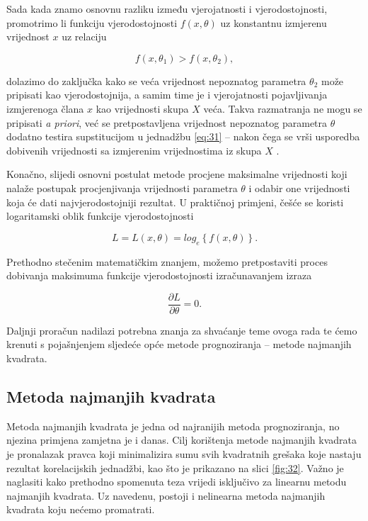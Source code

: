 \documentclass[a4paper,12pt,oneside]{memoir}
\begin{document}
                
                Sada kada znamo osnovnu razliku između vjerojatnosti i vjerodostojnosti, promotrimo li funkciju vjerodostojnosti $f(x,\theta)$ uz konstantnu izmjerenu vrijednost $x$ uz relaciju

                \begin{equation}
                    f(x,\theta_1)>f(x,\theta_2),
                    \label{eq:33}
                \end{equation}

            dolazimo do zaključka kako se veća vrijednost nepoznatog parametra $\theta_2$ može pripisati kao vjerodostojnija, a samim time je i vjerojatnosti pojavljivanja izmjerenoga člana $x$ kao vrijednosti skupa $X$ veća. Takva razmatranja ne mogu se pripisati \textit{a priori}, već se pretpostavljena vrijednost nepoznatog parametra $\theta$ dodatno testira supstitucijom u jednadžbu \eqref{eq:31} -- nakon čega se vrši usporedba dobivenih vrijednosti sa izmjerenim vrijednostima iz skupa $X$ \cite{Broersen}.

                Konačno, slijedi osnovni postulat metode procjene maksimalne vrijednosti koji nalaže postupak procjenjivanja vrijednosti parametra $\theta$ i odabir one vrijednosti koja će dati najvjerodostojniji rezultat. U praktičnoj primjeni, češće se koristi logaritamski oblik funkcije vjerodostojnosti
                
                \begin{equation}
                    L=L(x,\theta)=log_e\left\{f(x,\theta)\right\}.
                \end{equation}
        
                Prethodno stečenim matematičkim znanjem, možemo pretpostaviti proces dobivanja maksimuma funkcije vjerodostojnosti izračunavanjem izraza
                
                \begin{equation}
                    \frac{\partial L}{\partial \theta}=0.
                \end{equation}
                
                Daljnji proračun nadilazi potrebna znanja za shvaćanje teme ovoga rada te ćemo krenuti s pojašnjenjem sljedeće opće metode prognoziranja -- metode najmanjih kvadrata.

            \subsection{Metoda najmanjih kvadrata}
            \label{subs:LS}
                Metoda najmanjih kvadrata je jedna od najranijih metoda prognoziranja, no njezina primjena zamjetna je i danas. Cilj korištenja metode najmanjih kvadrata je pronalazak pravca koji minimalizira sumu svih kvadratnih grešaka koje nastaju rezultat korelacijskih jednadžbi, kao što je prikazano na slici \ref{fig:32}. Važno je naglasiti kako prethodno spomenuta teza vrijedi isključivo za linearnu metodu najmanjih kvadrata. Uz navedenu, postoji i nelinearna metoda najmanjih kvadrata koju nećemo promatrati.
\end{document}
